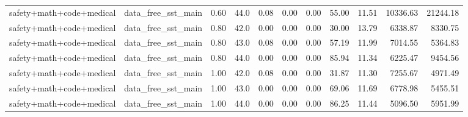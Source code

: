 \begin{table}[H]
{\begin{tabular}{llllrrrrrrr}
safety+math+code+medical & data\_free\_sst\_main & 0.60 & 44.0 & 0.08 & 0.00 & 0.00 & 55.00 & 11.51 & 10336.63 & 21244.18 \\
safety+math+code+medical & data\_free\_sst\_main & 0.80 & 42.0 & 0.00 & 0.00 & 0.00 & 30.00 & 13.79 & 6338.87 & 8330.75 \\
safety+math+code+medical & data\_free\_sst\_main & 0.80 & 43.0 & 0.08 & 0.00 & 0.00 & 57.19 & 11.99 & 7014.55 & 5364.83 \\
safety+math+code+medical & data\_free\_sst\_main & 0.80 & 44.0 & 0.00 & 0.00 & 0.00 & 85.94 & 11.34 & 6225.47 & 9454.56 \\
safety+math+code+medical & data\_free\_sst\_main & 1.00 & 42.0 & 0.08 & 0.00 & 0.00 & 31.87 & 11.30 & 7255.67 & 4971.49 \\
safety+math+code+medical & data\_free\_sst\_main & 1.00 & 43.0 & 0.00 & 0.00 & 0.00 & 69.06 & 11.69 & 6778.98 & 5455.51 \\
safety+math+code+medical & data\_free\_sst\_main & 1.00 & 44.0 & 0.00 & 0.00 & 0.00 & 86.25 & 11.44 & 5096.50 & 5951.99 \\
\bottomrule
\end{tabular}
}
\end{table}


